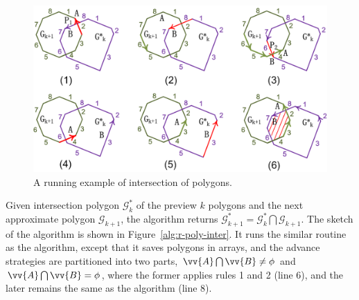 \begin{figure}[tb!]
\centering
\includegraphics[scale=0.88]{figures/Fig-r-poly-inter.png}
\vspace{-1ex}
\caption{\small A running example of intersection of polygons.}
\label{fig:r-poly-inter}
\end{figure}




Given intersection polygon $\mathcal{G}^*_k$ of the preview $k$ polygons and the next approximate polygon $\mathcal{G}_{k+1}$, the algorithm \rpia returns $\mathcal{G}^*_{k+1} = \mathcal{G}^*_k  \bigcap \mathcal{G}_{k+1}$.
The sketch of the algorithm is shown in Figure~\ref{alg:r-poly-inter}.
%
It runs the similar routine as the \cpia algorithm, except that it saves polygons in arrays, and the advance strategies are partitioned into two parts, \ie $\vv{A} \bigcap \vv{B} \ne \phi$ and $\vv{A} \bigcap \vv{B} = \phi$, where the former applies rules 1 and 2 (line 6), and the later remains the same as the \cpia algorithm (line 8).







